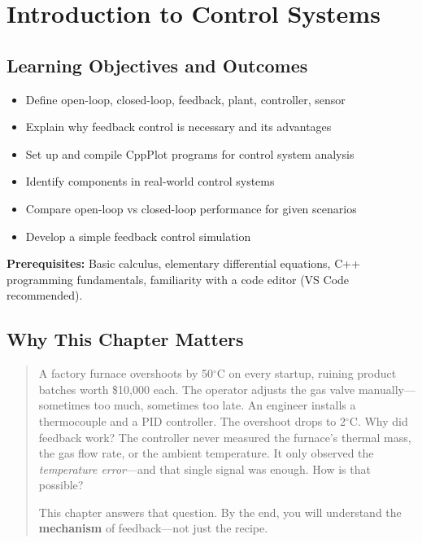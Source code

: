 
\chapter{Introduction to Control Systems}

\section*{Learning Objectives and Outcomes}
\begin{itemize}
    \item Define open-loop, closed-loop, feedback, plant, controller, sensor
    \item Explain why feedback control is necessary and its advantages
    \item Set up and compile CppPlot programs for control system analysis
    \item Identify components in real-world control systems
    \item Compare open-loop vs closed-loop performance for given scenarios
    \item Develop a simple feedback control simulation
\end{itemize}

\textbf{Prerequisites:} Basic calculus, elementary differential equations, C++ programming fundamentals, familiarity with a code editor (VS Code recommended).

\section{Why This Chapter Matters}
\begin{quote}
A factory furnace overshoots by 50$^\circ$C on every startup, ruining product batches worth \$10,000 each. The operator adjusts the gas valve manually---sometimes too much, sometimes too late. An engineer installs a thermocouple and a PID controller. The overshoot drops to 2$^\circ$C. Why did feedback work? The controller never measured the furnace's thermal mass, the gas flow rate, or the ambient temperature. It only observed the \emph{temperature error}---and that single signal was enough. How is that possible?

This chapter answers that question. By the end, you will understand the \textbf{mechanism} of feedback---not just the recipe.
\end{quote}

